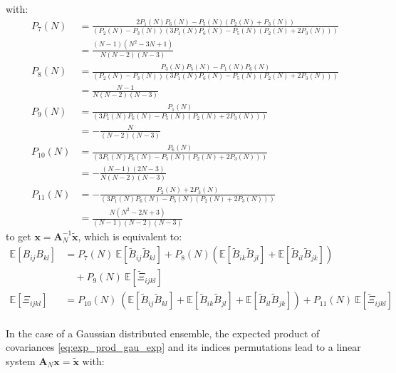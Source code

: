 \documentclass[12pt]{scrartcl}
\begin{document}
with:
\begin{subequations}
\begin{align}
P_7(N) & = \frac{2 P_1(N) P_6(N) - P_5(N)\left(P_2(N)+P_3(N)\right)}{\left(P_2(N)-P_3(N)\right)\left(3 P_1(N) P_6(N) - P_5(N) \left(P_2(N) + 2P_3(N)\right)\right)} \nonumber \\
& = \frac{(N-1)(N^2-3N+1)}{N(N-2)(N-3)} \\
P_8(N) & = \frac{P_3(N) P_5(N) - P_1(N) P_6(N)}{\left(P_2(N)-P_3(N)\right)\left(3 P_1(N) P_6(N) - P_5(N) \left(P_2(N) + 2 P_3(N)\right)\right)} \nonumber \\
& = \frac{N-1}{N(N-2)(N-3)} \\
P_9(N) & = \frac{P_1(N)}{\left(3 P_1(N) P_6(N) - P_5(N) \left(P_2(N) + 2P_3(N)\right)\right)} \nonumber \\
& = -\frac{N}{(N-2)(N-3)} \\
P_{10}(N) & = \frac{P_6(N)}{\left(3 P_1(N) P_6(N) - P_5(N) \left(P_2(N) + 2P_3(N)\right)\right)} \nonumber \\
& = -\frac{(N-1)(2N-3)}{N(N-2)(N-3)} \\
P_{11}(N) & = -\frac{P_2(N)+2 P_3(N)}{\left(3 P_1(N) P_6(N) - P_5(N) \left(P_2(N) + 2P_3(N)\right)\right)} \nonumber \\
& = \frac{N(N^2-2N+3)}{(N-1)(N-2)(N-3)}
\end{align}
\end{subequations}
to get $\mathbf{x} = \mathbf{A}_N^{-1} \widetilde{\mathbf{x}}$, which is equivalent to:
\begin{subequations}
\begin{align}
\label{eq:prod_asy_cov}
\mathbb{E} \left[B_{ij} B_{kl}\right] & = P_7(N) \ \mathbb{E} \left[\widetilde{B}_{ij} \widetilde{B}_{kl}\right] + P_8(N) \left(\mathbb{E} \left[\widetilde{B}_{ik} \widetilde{B}_{jl}\right] + \mathbb{E} \left[\widetilde{B}_{il} \widetilde{B}_{jk}\right]\right) \nonumber \\
& \quad + P_9(N) \ \mathbb{E} \left[\widetilde{\Xi}_{ijkl}\right] \\
\label{eq:asy_mom_4}
\mathbb{E} \left[\Xi_{ijkl}\right] & = P_{10}(N) \ \left(\mathbb{E} \left[\widetilde{B}_{ij} \widetilde{B}_{kl}\right] + \mathbb{E} \left[\widetilde{B}_{ik} \widetilde{B}_{jl}\right] + \mathbb{E} \left[\widetilde{B}_{il} \widetilde{B}_{jk}\right]\right) + P_{11}(N) \ \mathbb{E} \left[\widetilde{\Xi}_{ijkl}\right]
\end{align}
\end{subequations}
$  $\\
In the case of a Gaussian distributed ensemble, the expected product of covariances \eqref{eq:exp_prod_gau_exp} and its indices permutations lead to a linear system $\mathbf{A}_N \mathbf{x} = \widetilde{\mathbf{x}}$ with:
\end{document}
